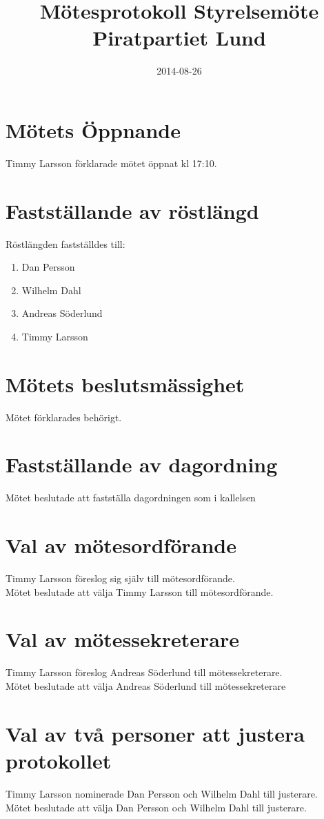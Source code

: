 \documentclass[a4paper,10pt]{article}
\title{\vspace{-1.5in}\textmd{\textbf{Mötesprotokoll Styrelsemöte Piratpartiet Lund}}}
\date{2014-08-26}
\author{}
\begin{document}
\maketitle

\section{Mötets Öppnande}
Timmy Larsson förklarade mötet öppnat kl 17:10.

\section{Fastställande av röstlängd}
Röstlängden fastställdes till:
\begin{enumerate}
\item Dan Persson
\item Wilhelm Dahl
\item Andreas Söderlund
\item Timmy Larsson
\end{enumerate}

\section{Mötets beslutsmässighet}
Mötet förklarades behörigt.

\section{Fastställande av dagordning}
Mötet beslutade att fastställa dagordningen som i kallelsen

\newpage

\section{Val av mötesordförande}
Timmy Larsson föreslog sig själv till mötesordförande.\\
Mötet beslutade att välja Timmy Larsson till mötesordförande.

\section{Val av mötessekreterare}
Timmy Larsson föreslog Andreas Söderlund till mötessekreterare.\\
Mötet beslutade att välja Andreas Söderlund till mötessekreterare

\section{Val av två personer att justera protokollet}
Timmy Larsson nominerade Dan Persson och Wilhelm Dahl till justerare.\\
Mötet beslutade att välja Dan Persson och Wilhelm Dahl till justerare.
\end{document}
